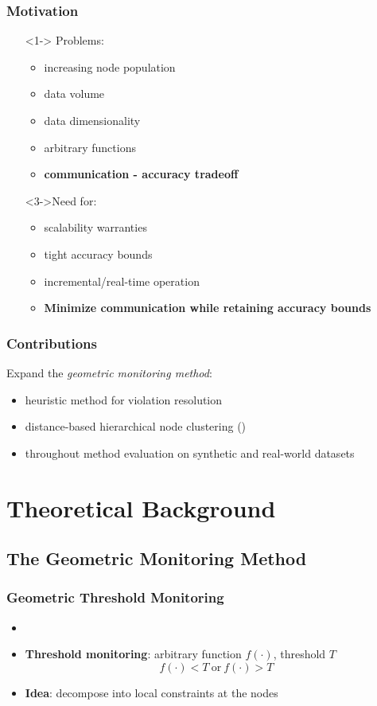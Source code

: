 \documentclass[hyperref={pdfpagelabels=false}]{beamer}
\begin{document}
\begin{frame} \frametitle{Motivation}
\begin{itemize}
\item[]<1-> Problems:
\begin{itemize}
	\item<1-> increasing node population
	\item<1-> data volume
	\item<1-> data dimensionality
	\item<1-> arbitrary functions
	\item<2-> \textbf{communication - accuracy tradeoff}
\end{itemize}
\item[]<3->Need for:
\begin{itemize}
	\item<3-> scalability warranties
	\item<3-> tight accuracy bounds
	\item<3-> incremental/real-time operation
	\item<4-> \textbf{Minimize communication while retaining accuracy bounds}
\end{itemize}
\end{itemize}
\end{frame}

\begin{frame} \frametitle{Contributions}
Expand the \emph{geometric monitoring method}:
\begin{itemize}
\item<1-> heuristic method for violation resolution
\item<2-> distance-based hierarchical node clustering \tiny()
\item<3-> throughout method evaluation on synthetic and real-world datasets
\end{itemize}
\end{frame}

\section{Theoretical Background}
\begin{frame}
  \tableofcontents[currentsection]
 \end{frame}
\subsection{The Geometric Monitoring Method}
\begin{frame} \frametitle{Geometric Threshold Monitoring}
\begin{itemize}
\item {}
\item \textbf{Threshold monitoring}: arbitrary function $f(\cdot)$, threshold $T$\\
 $$f(\cdot)<T\ \text{or}\ f(\cdot)>T$$
\item \textbf{Idea}: decompose into local constraints at the nodes
\end{itemize}
\end{frame}
\end{document}

